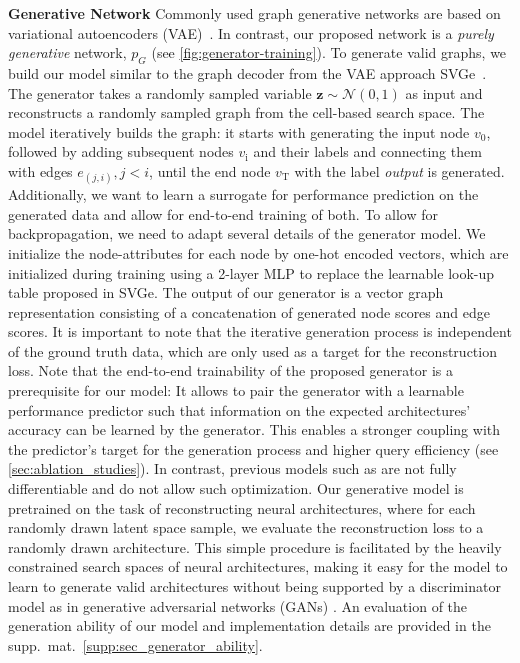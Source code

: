 \documentclass[runningheads]{llncs}
\begin{document}
\noindent \textbf{Generative Network}
Commonly used graph generative networks are based on variational  autoencoders (VAE)~\cite{2014VAE}.
In contrast, our proposed network is a \emph{purely generative} network, $p_G$ (see \autoref{fig:generator-training}).
To generate valid graphs, we build our model similar to the graph decoder from the VAE approach SVGe~\cite{2021SVGe}. The generator takes a randomly sampled variable $\textbf{z} \sim \mathcal{N}(0,1)$ as input and reconstructs a randomly sampled graph from the cell-based search space. The model iteratively builds the graph: it starts with generating the input node $v_\textrm{0}$, followed by adding subsequent nodes $v_\textrm{i}$ and their labels and connecting them with edges $e_{(j,i)}, j<i$, until the end node $v_\textrm{T}$ with the label \textit{output} is generated. Additionally, we want to learn a surrogate for performance prediction on the generated data and allow for end-to-end training of both. 
To allow for backpropagation, we need to adapt several details of the generator model. We initialize the node-attributes for each node by one-hot encoded vectors, which are initialized during training using a 2-layer MLP to replace the learnable look-up table proposed in SVGe. The output of our generator is a vector graph representation consisting of a concatenation of generated node scores and edge scores. It is important to note that the iterative generation process is independent of the ground truth data, which are only used as a target for the reconstruction loss. Note that the end-to-end trainability of the proposed generator is a prerequisite for our model: It allows to pair the generator with a learnable performance predictor such that information on the expected architectures' accuracy can be learned by the generator. This enables a stronger coupling with the predictor's target for the generation process and higher query efficiency (see \autoref{sec:ablation_studies}). In contrast, previous models such as \cite{2021SGNAS,2021SVGe,2020Arch2vec} are not fully differentiable and do not allow such optimization.
Our generative model is pretrained on the task of reconstructing neural architectures, where for each randomly drawn latent space sample, we evaluate the reconstruction loss to a randomly drawn architecture.
This simple procedure is facilitated by the heavily constrained search spaces of neural architectures, making it easy for the model to learn to generate valid architectures without being supported by a discriminator model as in generative adversarial networks (GANs) \cite{2014GAN}. An evaluation of the generation ability of our model and implementation details are provided in the supp.~mat.~\autoref{supp:sec_generator_ability}.
\end{document}
